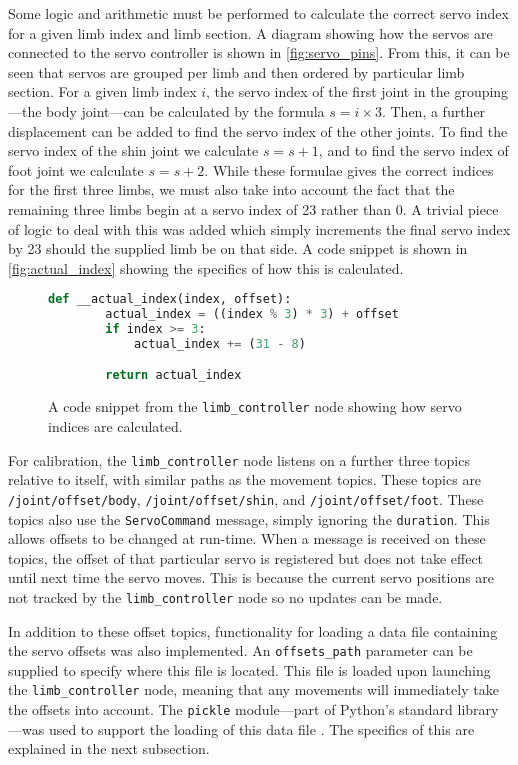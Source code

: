 Some logic and arithmetic must be performed to calculate the correct servo index for a given limb index and limb section. A diagram showing how the servos are connected to the servo controller is shown in \autoref{fig:servo_pins}. From this, it can be seen that servos are grouped per limb and then ordered by particular limb section. For a given limb index $i$, the servo index of the first joint in the grouping---the body joint---can be calculated by the formula $s = i \times 3$. Then, a further displacement can be added to find the servo index of the other joints. To find the servo index of the shin joint we calculate $s = s + 1$, and to find the servo index of foot joint we calculate $s = s + 2$. While these formulae gives the correct indices for the first three limbs, we must also take into account the fact that the remaining three limbs begin at a servo index of 23 rather than 0. A trivial piece of logic to deal with this was added which simply increments the final servo index by 23 should the supplied limb be on that side. A code snippet is shown in \autoref{fig:actual_index} showing the specifics of how this is calculated.

\begin{figure}[!h]
    \centering
	\begin{lstlisting}[language=Python]
	def __actual_index(index, offset):
		actual_index = ((index % 3) * 3) + offset
		if index >= 3:
			actual_index += (31 - 8)

		return actual_index
	\end{lstlisting}
	\caption{A code snippet from the \texttt{limb\_controller} node showing how servo indices are calculated.}
	\label{fig:actual_index}
\end{figure}

For calibration, the \texttt{limb\_controller} node listens on a further three topics relative to itself, with similar paths as the movement topics. These topics are \texttt{/joint/offset/body}, \texttt{/joint/offset/shin}, and \texttt{/joint/offset/foot}. These topics also use the \texttt{ServoCommand} message, simply ignoring the \texttt{duration}. This allows offsets to be changed at run-time. When a message is received on these topics, the offset of that particular servo is registered but does not take effect until next time the servo moves. This is because the current servo positions are not tracked by the \texttt{limb\_controller} node so no updates can be made.

In addition to these offset topics, functionality for loading a data file containing the servo offsets was also implemented. An \texttt{offsets\_path} parameter can be supplied to specify where this file is located. This file is loaded upon launching the \texttt{limb\_controller} node, meaning that any movements will immediately take the offsets into account. The \texttt{pickle} module---part of Python's standard library---was used to support the loading of this data file \cite{pickle}. The specifics of this are explained in the next subsection.

